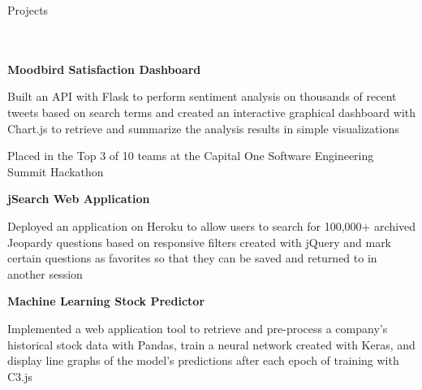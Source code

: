 \documentclass{article}
\newcommand{\header}[1]{{
\hspace*{-15pt}\vspace*{6pt} \large{#1}} \vspace*{-6pt} 
\lineunder
}
\newcommand{\lineunder}{
\vspace*{-8pt} \\ \hspace*{-18pt} 
\hrulefill \\
}
\newcommand{\project}[4]{{
\vspace*{2pt}%
\textbf{#1} #2 \hfill #3\\ #4 \vspace*{2pt}}
}
\renewcommand{\labelitemii}{
$\vcenter{\hbox{\tiny$\bullet$}}$\hspace*{-3pt}
}
\newenvironment{bullet-list-minor}{
\begin{list}{\labelitemii}{\setlength\leftmargin{15pt} 
\topsep 0pt \itemsep -2pt}}{\vspace*{4pt}\end{list}
}
\begin{document}
\medskip
\smallskip

\vspace*{4pt}%
\header{Projects}
    \vspace{4pt}
    \project{Moodbird Satisfaction Dashboard}{}{}{}
	\begin{bullet-list-minor} 
	\item Built an API with Flask to perform sentiment analysis on thousands of recent tweets based on search terms and created an interactive graphical dashboard with Chart.js to retrieve and summarize the analysis results in simple visualizations
	\item Placed in the Top 3 of 10 teams at the Capital One Software Engineering Summit Hackathon
    \end{bullet-list-minor}
    \smallskip
    \project{jSearch Web Application}{}{}{}
	\begin{bullet-list-minor}
	\item Deployed an application on Heroku to allow users to search for 100,000+ archived Jeopardy questions based on responsive filters created with jQuery and mark certain questions as favorites so that they can be saved and returned to in another session
    \end{bullet-list-minor}
    \smallskip    
    \project{Machine Learning Stock Predictor}{}{}{}
	\begin{bullet-list-minor}
	\item Implemented a web application tool to retrieve and pre-process a company's historical stock data with Pandas, train a neural network created with Keras, and display line graphs of the model's predictions after each epoch of training with C3.js
    \end{bullet-list-minor}
\end{document}
